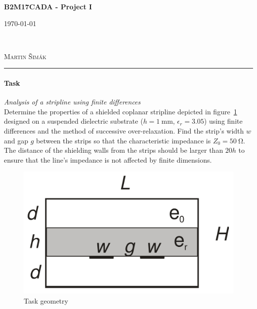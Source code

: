 \documentclass[11pt,a4paper]{article}
\begin{document}

\begin{center}
    {\LARGE\textbf{B2M17CADA - Project I}}\\[3mm]
    \begin{minipage}{0.4\textwidth}
        \begin{flushleft}
            \textsc{\today}
        \end{flushleft}
    \end{minipage}
    ~
    \begin{minipage}{0.4\textwidth}
        \begin{flushright}
            \textsc{Martin Šimák}
        \end{flushright}
    \end{minipage}
    \noindent\rule{14.5cm}{0.4pt}
\end{center}

\paragraph{Task} \emph{Analysis of a stripline using finite differences}\\
Determine the properties of a shielded coplanar stripline depicted in figure~\ref{fig:task-geometry} designed on a suspended dielectric substrate ($h = 1~\mathrm{mm}$, $\epsilon_r = 3.05$) using finite differences and the method of successive over-relaxation. Find the strip's width $w$ and gap $g$ between the strips so that the characteristic impedance is $Z_0 = 50~\mathrm{\Omega}$. The distance of the shielding walls from the strips should be larger than $20h$ to ensure that the line's impedance is not affected by finite dimensions.
\begin{figure}[!ht]
    \centering
    \includegraphics[width=.4\textwidth]{src/task-geometry.png}
    \caption{Task geometry}
    \label{fig:task-geometry}
\end{figure}
\end{document}
